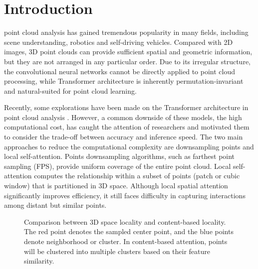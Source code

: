 \documentclass[lettersize,journal]{IEEEtran}
\begin{document}
\section{Introduction}
 point cloud analysis has gained tremendous popularity in many fields, including scene understanding\cite{motive,localization,reconstruction},
robotics and self-driving vehicles\cite{lidar,ranseg,track}. 
Compared with 2D images, 3D point clouds can provide sufficient spatial and geometric information, 
but they are not arranged in any particular order. 
Due to its irregular structure, 
the convolutional neural networks cannot be directly applied to point cloud processing, while
Transformer\cite{transformer} architecture is inherently permutation-invariant and natural-suited for point cloud learning.

Recently, some explorations have been made on the Transformer architecture in point cloud analysis \cite{pointtransformer,pct,pointformer,fastpoint,stratified,pvt,unified}.
However, a common downside of these models, the high computational cost, has caught the attention of researchers
and motivated them to consider the trade-off between accuracy and inference speed.
The two main approaches to reduce the computational complexity are downsampling points and local self-attention\cite{pointtransformer,pvt,fastpoint,stratified}.
Points downsampling algorithms, such as farthest point sampling (FPS)\cite{pointnet2}, provide uniform coverage of the entire point cloud.
Local self-attention computes the relationship within a subset of points (patch or cubic window) that is partitioned in 3D space. 
Although local spatial attention significantly improves efficiency, 
it still faces difficulty in capturing interactions among distant but similar points. 


\begin{figure}[t]
  \centering


   \caption{Comparison between 3D space locality and  content-based locality.  The red point denotes the sampled center point, and the blue points denote neighborhood or cluster. In content-based attention, points will be clustered into multiple clusters based on their feature similarity.}
  \label{fig:local}
  \end{figure}
\end{document}
